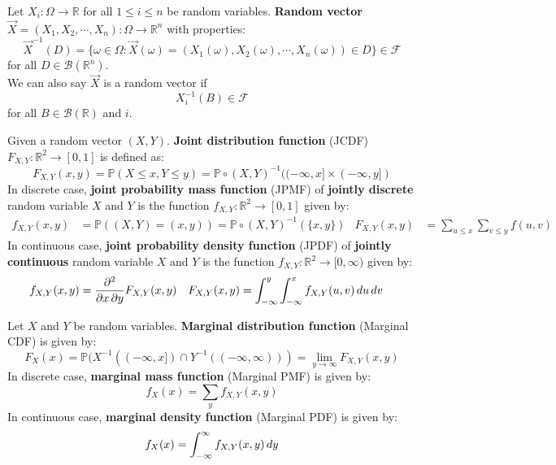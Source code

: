 \documentclass{huhtakm-template-book}
\newcommand{\prob}{\mathbb{P}}
\begin{document}
\newpage
\begin{sdefn}
	Let $X_{i}:\Omega\to\mathbb{R}$ for all $1\leq i\leq n$ be random variables. \textbf{Random vector} $\vec{X}=(X_{1},X_{2},\cdots,X_{n}):\Omega\to\mathbb{R}^{n}$ with properties:
	\begin{equation*}
		\vec{X}^{-1}(D)=\{\omega\in\Omega:\vec{X}(\omega)=(X_{1}(\omega),X_{2}(\omega),\cdots,X_{n}(\omega))\in D\}\in\mathcal{F}
	\end{equation*}
	for all $D\in\mathcal{B}(\mathbb{R}^{n})$.\\
	We can also say $\vec{X}$ is a random vector if
	\begin{equation*}
		X_{i}^{-1}(B)\in\mathcal{F}
	\end{equation*}
	for all $B\in\mathcal{B}(\mathbb{R})$ and $i$.
\end{sdefn}
\begin{sdefn}
	Given a random vector $(X,Y)$. \textbf{Joint distribution function} (JCDF) $F_{X,Y}:\mathbb{R}^{2}\to[0,1]$ is defined as:
	\begin{equation*}
		F_{X,Y}(x,y)=\prob(X\leq x,Y\leq y)=\prob\circ(X,Y)^{-1}((-\infty,x]\times(-\infty,y])
	\end{equation*}
	In discrete case, \textbf{joint probability mass function} (JPMF) of \textbf{jointly discrete} random variable $X$ and $Y$ is the function $f_{X,Y}:\mathbb{R}^{2}\to[0,1]$ given by:
	\begin{align*}
		f_{X,Y}(x,y)&=\prob((X,Y)=(x,y))=\prob\circ(X,Y)^{-1}(\{x,y\}) & F_{X,Y}(x,y)&=\sum_{u\leq x}\sum_{v\leq y}f(u,v)
	\end{align*}
	In continuous case, \textbf{joint probability density function} (JPDF) of \textbf{jointly continuous} random variable $X$ and $Y$ is the function $f_{X,Y}:\mathbb{R}^{2}\to[0,\infty)$ given by:
	\begin{align*}
		f_{X,Y}(x,y)&=\pdv*{F_{X,Y}(x,y)}{x,y} & F_{X,Y}(x,y)&=\int_{-\infty}^{y}\int_{-\infty}^{x}f_{X,Y}(u,v)\,du\,dv
	\end{align*}
\end{sdefn}
\begin{sdefn}
	Let $X$ and $Y$ be random variables. \textbf{Marginal distribution function} (Marginal CDF) is given by:
	\begin{equation*}
		F_{X}(x)=\prob(X^{-1}((-\infty,x])\cap Y^{-1}((-\infty,\infty)))=\lim_{y\to\infty}F_{X,Y}(x,y)
	\end{equation*}
	In discrete case, \textbf{marginal mass function} (Marginal PMF) is given by:
	\begin{equation*}
		f_{X}(x)=\sum_{y}f_{X,Y}(x,y)
	\end{equation*}
	In continuous case, \textbf{marginal density function} (Marginal PDF) is given by:
	\begin{equation*}
		f_{X}(x)=\int_{-\infty}^{\infty} f_{X,Y}(x,y)\,dy
	\end{equation*}
\end{sdefn}
\end{document}
